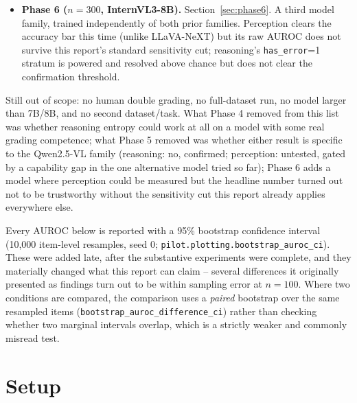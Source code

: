 \documentclass[11pt]{article}
\begin{document}
\begin{itemize}
    The only dataset change in this report. A sizing check, gated: the
    model answers ``error'' regardless of whether it can read the image,
    so the run measures response bias rather than grading.
  \item \textbf{Phase 6 ($n=300$, InternVL3-8B).} Section~\ref{sec:phase6}.
    A third model family, trained independently of both prior families.
    Perception clears the accuracy bar this time (unlike LLaVA-NeXT) but
    its raw AUROC does not survive this report's standard sensitivity cut;
    reasoning's \texttt{has\_error}=1 stratum is powered and resolved
    above chance but does not clear the confirmation threshold.
\end{itemize}

Still out of scope: no human double grading, no full-dataset run, no model
larger than 7B/8B, and no second dataset/task. What Phase 4 removed from
this list was whether reasoning entropy could work at all on a model with
some real grading competence; what Phase 5 removed was whether either
result is specific to the Qwen2.5-VL family (reasoning: no, confirmed;
perception: untested, gated by a capability gap in the one alternative
model tried so far); Phase 6 adds a model where perception could be
measured but the headline number turned out not to be trustworthy without
the sensitivity cut this report already applies everywhere else.

Every AUROC below is reported with a 95\% bootstrap confidence interval
(10{,}000 item-level resamples, seed 0; \texttt{pilot.plotting.bootstrap\_auroc\_ci}).
These were added late, after the substantive experiments were complete, and
they materially changed what this report can claim -- several differences it
originally presented as findings turn out to be within sampling error at
$n=100$. Where two conditions are compared, the comparison uses a
\emph{paired} bootstrap over the same resampled items
(\texttt{bootstrap\_auroc\_difference\_ci}) rather than checking whether two
marginal intervals overlap, which is a strictly weaker and commonly misread
test.

\section{Setup}
\end{document}
